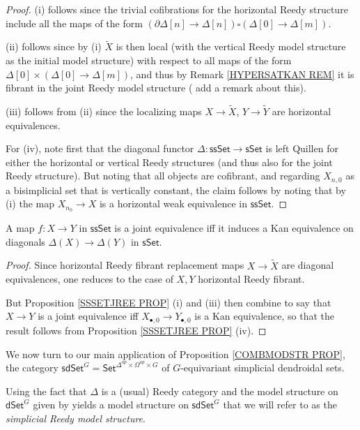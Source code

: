 \documentclass[a4paper,10pt,draft]{article}%
\numberwithin{equation}{section}%
\begin{document}
\begin{proof}
(i) follows since the trivial cofibrations for the horizontal Reedy structure include all the maps of the form
$(\partial \Delta[n] \to \Delta[n]) \square (\Delta[0] \to \Delta[m])$.

(ii) follows since by (i) $\tilde{X}$ is then local
(with the vertical Reedy model structure as the initial model structure)
with respect to all maps of the form
$\Delta[0] \times (\Delta[0] \to \Delta[m])$,
and thus by Remark \ref{HYPERSATKAN REM}
it is fibrant in the joint Reedy model structure ({\color{blue} add a remark about this}).

(iii) follows from (ii) since the localizing maps 
$X \to \tilde{X}$, $Y \to \tilde{Y}$
are horizontal equivalences.

For (iv), note first that the diagonal functor
$\Delta \colon \mathsf{ssSet} \to \mathsf{sSet}$
is left Quillen for either the horizontal or vertical Reedy structures (and thus also for the joint Reedy structure). But noting that all objects are cofibrant, and regarding 
$X_{n,0}$ as a bisimplicial set that is vertically constant, the claim
follows by noting that by (i) the map
$X_{n_0} \to X$ is a horizontal weak equivalence in $\mathsf{ssSet}$.
\end{proof}

\begin{corollary}
	A map $f\colon X \to Y$ in $\mathsf{ssSet}$ is a joint equivalence iff it induces a Kan equivalence on diagonals
	$\Delta(X) \to \Delta(Y)$ in $\mathsf{sSet}$.
\end{corollary}

\begin{proof}
	Since horizontal Reedy fibrant replacement maps
	$X \to \tilde{X}$ are diagonal equivalences, 
	one reduces to the case of $X,Y$ horizontal Reedy fibrant.
	
	But Proposition \ref{SSSETJREE PROP} (i) and (iii) then combine to say that $X \to Y$ is a joint equivalence iff
	$X_{\bullet,0} \to Y_{\bullet,0}$ is a Kan equivalence, 
	so that the result follows from Proposition \ref{SSSETJREE PROP} (iv).
\end{proof}


We now turn to our main application of Proposition \ref{COMBMODSTR PROP}, the category 
$\mathsf{sdSet}^G = \mathsf{Set}^{\Delta^{op} \times \Omega^{op} \times G}$
of $G$-equivariant simplicial dendroidal sets.

Using the fact that $\Delta$ is a (usual) Reedy category
and the model structure on $\mathsf{dSet}^G$ given by 
\cite[Thm. 2.1]{Per17}
yields a model structure on $\mathsf{sdSet}^G$
that we will refer to as the \textit{simplicial Reedy model structure}.
\end{document}
